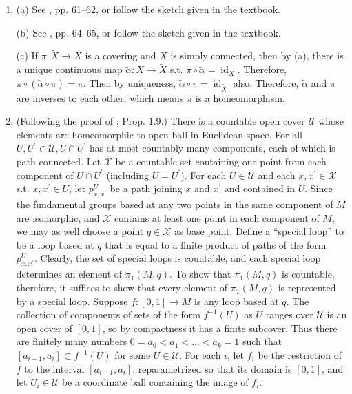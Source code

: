 \begin{enumerate}
For ($\Rightarrow$) part, $d \omega(X, Y)=-\omega[X, Y]=0$ by assumption, 
so by using the Maurer--Cartan equation, $d \omega$ should be in $\mathcal{I}$.
\item (a) See \cite{1}, pp. 61--62, or follow the sketch given in the textbook.

(b) See \cite{1}, pp. 64--65, or follow the sketch given in the textbook.

(c) If $\pi\colon \tilde{X} \rightarrow X$ is a covering and $X$ is simply connected, 
then by (a), there is a unique continuous map $\tilde{\alpha}\colon X \rightarrow \tilde{X}$ s.t. $\pi \circ \tilde{\alpha}=\operatorname{id}_{X}$. 
Therefore, $\pi \circ(\tilde{\alpha} \circ \pi)=\pi$. 
Then by uniqueness, $\tilde{\alpha} \circ \pi=\operatorname{id}_{\tilde{X}}$ also. 
Therefore, $\tilde{\alpha}$ and $\pi$ are inverses to each other, which means $\pi$ is a homeomorphism.
\item (Following the proof of \cite{4}, Prop. 1.9.) There is a countable open cover $\mathcal{U}$ whose elements are homeomorphic to open ball in Euclidean space. 
For all $U, U^{\prime} \in \mathcal{U}, U \cap U^{\prime}$ has at most countably many components, each of which is path connected. 
Let $\mathcal{X}$ be a countable set containing one point from each component of $U \cap U^{\prime}$ (including $U=U^{\prime}$). 
For each $U \in \mathcal{U}$ and each $x, x^{\prime} \in \mathcal{X}$ s.t. $x, x^{\prime} \in U$, let $p_{x, x^{\prime}}^{U}$ be a path joining $x$ and $x^{\prime}$ and contained in $U$.
Since the fundamental groups based at any two points in the same component of $M$ are isomorphic, and $\mathcal{X}$ contains at least one point in each component of $M$, we may as well choose a point $q \in \mathcal{X}$ as base point. 
Define a ``special loop'' to be a loop based at $q$ that is equal to a finite product of paths of the form $p_{x, x^{\prime}}^{U}$. 
Clearly, the set of special loops is countable, and each special loop determines an element of $\pi_{1}(M, q)$. 
To show that $\pi_{1}(M, q)$ is countable, therefore, it suffices to show that every element of $\pi_{1}(M, q)$ is represented by a special loop.
Suppose $f\colon [0,1] \rightarrow M$ is any loop based at $q$. 
The collection of components of sets of the form $f^{-1}(U)$ as $U$ ranges over $\mathcal{U}$ is an open cover of $[0,1]$, so by compactness it has a finite subcover. 
Thus there are finitely many numbers $0=a_{0}<a_{1}<\ldots<a_{k}=1$ such that $\left[a_{i-1}, a_{i}\right] \subset f^{-1}(U)$ for some $U \in \mathcal{U}$. 
For each $i$, let $f_{i}$ be the restriction of $f$ to the interval $[a_{i-1}, a_{i}]$, reparametrized so that its domain is $[0,1]$, and let $U_{i} \in \mathcal{U}$ be a coordinate ball containing the image of $f_{i}$. 

\end{enumerate}
